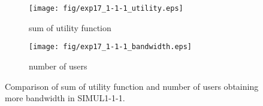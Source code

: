 	\begin{figure}
		\begin{center}
			\begin{subfigure}[b]{0.8\textwidth}
				\centering
				\texttt{[image: fig/exp17\_1-1-1\_utility.eps]}
				\caption{sum of utility function}
				\label{figure:simul1_1_1_u_a}
			\end{subfigure}
			\begin{subfigure}[b]{0.8\textwidth}
				\centering
				\texttt{[image: fig/exp17\_1-1-1\_bandwidth.eps]}
				\caption{number of users}
				\label{figure:simul1_1_1_u_b}
			\end{subfigure}
			\caption{Comparison of sum of utility function and number of users obtaining more bandwidth in SIMUL1-1-1.}
			\label{figure:simul1_1_1_u}
		\end{center}
	\end{figure}

\clearpage

